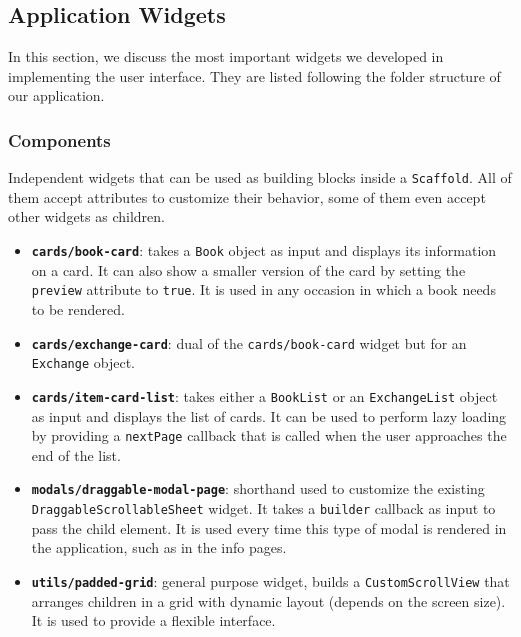 \subsection{Application Widgets}
In this section, we discuss the most important widgets we developed in implementing the user interface.
They are listed following the folder structure of our application.

\subsubsection{Components}
Independent widgets that can be used as building blocks inside a \texttt{Scaffold}.
All of them accept attributes to customize their behavior, some of them even accept other widgets as children.

\begin{itemize}
      \item \textbf{\texttt{cards/book-card}}:
            takes a \texttt{Book} object as input and displays its information on a card.
            It can also show a smaller version of the card by setting the \texttt{preview} attribute to \texttt{true}.
            It is used in any occasion in which a book needs to be rendered.
      \item \textbf{\texttt{cards/exchange-card}}:
            dual of the \texttt{cards/book-card} widget but for an \texttt{Exchange} object.
      \item \textbf{\texttt{cards/item-card-list}}:
            takes either a \texttt{BookList} or an \texttt{ExchangeList} object as input and displays the list of cards.
            It can be used to perform lazy loading by providing a \texttt{nextPage} callback that is called when the user
            approaches the end of the list.
      \item \textbf{\texttt{modals/draggable-modal-page}}:
            shorthand used to customize the existing \texttt{DraggableScrollableSheet} widget.
            It takes a \texttt{builder} callback as input to pass the child element.
            It is used every time this type of modal is rendered in the application, such as in the info pages.
      \item \textbf{\texttt{utils/padded-grid}}:
            general purpose widget, builds a \texttt{CustomScrollView} that arranges children in a grid with
            dynamic layout (depends on the screen size). It is used to provide a flexible interface.
\end{itemize}


